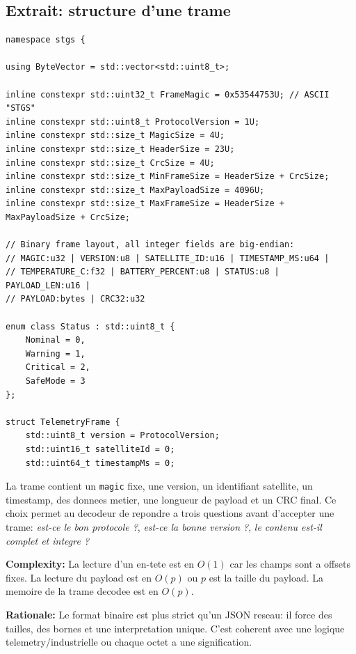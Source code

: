 \documentclass[10pt,a4paper]{article}
\newcommand{\complexity}[1]{\textbf{Complexity:} #1}
\newcommand{\rationale}[1]{\textbf{Rationale:} #1}
\begin{document}
\subsection{Extrait: structure d'une trame}
\begin{lstlisting}[caption={Structure de trame binaire et constantes de protocole}]
namespace stgs {

using ByteVector = std::vector<std::uint8_t>;

inline constexpr std::uint32_t FrameMagic = 0x53544753U; // ASCII "STGS"
inline constexpr std::uint8_t ProtocolVersion = 1U;
inline constexpr std::size_t MagicSize = 4U;
inline constexpr std::size_t HeaderSize = 23U;
inline constexpr std::size_t CrcSize = 4U;
inline constexpr std::size_t MinFrameSize = HeaderSize + CrcSize;
inline constexpr std::size_t MaxPayloadSize = 4096U;
inline constexpr std::size_t MaxFrameSize = HeaderSize + MaxPayloadSize + CrcSize;

// Binary frame layout, all integer fields are big-endian:
// MAGIC:u32 | VERSION:u8 | SATELLITE_ID:u16 | TIMESTAMP_MS:u64 |
// TEMPERATURE_C:f32 | BATTERY_PERCENT:u8 | STATUS:u8 | PAYLOAD_LEN:u16 |
// PAYLOAD:bytes | CRC32:u32

enum class Status : std::uint8_t {
    Nominal = 0,
    Warning = 1,
    Critical = 2,
    SafeMode = 3
};

struct TelemetryFrame {
    std::uint8_t version = ProtocolVersion;
    std::uint16_t satelliteId = 0;
    std::uint64_t timestampMs = 0;
\end{lstlisting}


La trame contient un \texttt{magic} fixe, une version, un identifiant satellite, un timestamp, des donnees metier, une longueur de payload et un CRC final. Ce choix permet au decodeur de repondre a trois questions avant d'accepter une trame: \textit{est-ce le bon protocole ?}, \textit{est-ce la bonne version ?}, \textit{le contenu est-il complet et integre ?}

\complexity{La lecture d'un en-tete est en $O(1)$ car les champs sont a offsets fixes. La lecture du payload est en $O(p)$ ou $p$ est la taille du payload. La memoire de la trame decodee est en $O(p)$.}

\rationale{Le format binaire est plus strict qu'un JSON reseau: il force des tailles, des bornes et une interpretation unique. C'est coherent avec une logique telemetry/industrielle ou chaque octet a une signification.}
\end{document}
